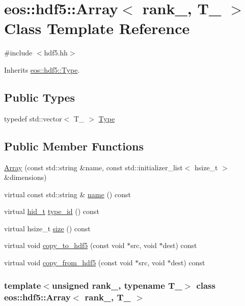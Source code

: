\hypertarget{classeos_1_1hdf5_1_1Array}{
\section{eos::hdf5::Array$<$ rank\_\-, T\_\- $>$ Class Template Reference}
\label{classeos_1_1hdf5_1_1Array}
}


{\ttfamily \#include $<$hdf5.hh$>$}

Inherits \hyperlink{structeos_1_1hdf5_1_1Type}{eos::hdf5::Type}.\subsection*{Public Types}
\begin{DoxyCompactItemize}
\item 
typedef std::vector$<$ T\_\- $>$ \hyperlink{classeos_1_1hdf5_1_1Array_a11f93349d9391d143099a25c59827610}{Type}
\end{DoxyCompactItemize}
\subsection*{Public Member Functions}
\begin{DoxyCompactItemize}
\item 
\hyperlink{classeos_1_1hdf5_1_1Array_a7b2da023a1a1b9f289cbc6484e8aad2c}{Array} (const std::string \&name, const std::initializer\_\-list$<$ hsize\_\-t $>$ \&dimensions)
\item 
virtual const std::string \& \hyperlink{classeos_1_1hdf5_1_1Array_aa533ea361fe7d7f589ea60ffee2120a5}{name} () const 
\item 
virtual \hyperlink{namespaceeos_1_1hdf5_a5bd5e209f1bf36cdc5551465dacf2e74}{hid\_\-t} \hyperlink{classeos_1_1hdf5_1_1Array_ac560c57df5f551234fd5ac77d1890d30}{type\_\-id} () const 
\item 
virtual hsize\_\-t \hyperlink{classeos_1_1hdf5_1_1Array_abbe03946de83c9b63d6fc35fc5a60c69}{size} () const 
\item 
virtual void \hyperlink{classeos_1_1hdf5_1_1Array_a4f0adbcb6e7136436afa14aee7ebc5c9}{copy\_\-to\_\-hdf5} (const void $\ast$src, void $\ast$dest) const 
\item 
virtual void \hyperlink{classeos_1_1hdf5_1_1Array_aedd48f5a8020d66426bd0adfc74fa6a9}{copy\_\-from\_\-hdf5} (const void $\ast$src, void $\ast$dest) const 
\end{DoxyCompactItemize}
\subsubsection*{template$<$unsigned rank\_\-, typename T\_\-$>$ class eos::hdf5::Array$<$ rank\_\-, T\_\- $>$}



